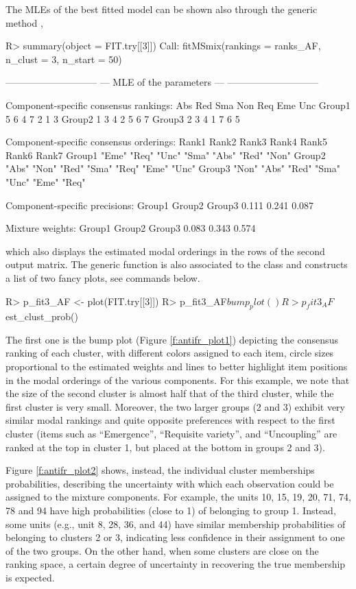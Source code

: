The MLEs of the best fitted model can be shown also through the generic method ,
\begin{example}
R> summary(object = FIT.try[[3]])
Call:
fitMSmix(rankings = ranks_AF, n_clust = 3, n_start = 50)

-----------------------------
--- MLE of the parameters ---
-----------------------------

Component-specific consensus rankings:
       Abs Red Sma Non Req Eme Unc
Group1   5   6   4   7   2   1   3
Group2   1   3   4   2   5   6   7
Group3   2   3   4   1   7   6   5

Component-specific consensus orderings:
       Rank1 Rank2 Rank3 Rank4 Rank5 Rank6 Rank7
Group1 "Eme" "Req" "Unc" "Sma" "Abs" "Red" "Non"
Group2 "Abs" "Non" "Red" "Sma" "Req" "Eme" "Unc"
Group3 "Non" "Abs" "Red" "Sma" "Unc" "Eme" "Req"

Component-specific precisions:
Group1 Group2 Group3
 0.111  0.241  0.087

Mixture weights:
Group1 Group2 Group3
 0.083  0.343  0.574
\end{example}
which also displays the estimated modal orderings in the rows of the second output matrix. The generic function  is also associated to the class  and constructs a list of two fancy plots, see commands below.
\begin{example}
R> p_fit3_AF <- plot(FIT.try[[3]])
R> p_fit3_AF$bump_plot()
R> p_fit3_AF$est_clust_prob()
\end{example}
The first one is the bump plot (Figure \ref{f:antifr_plot1}) depicting the consensus ranking of each cluster, with different colors assigned to each item, circle sizes proportional to the estimated weights and lines to better highlight item positions in the modal orderings of the various components. For this example, we note that the size of the second cluster is almost half that of the third cluster, while the first cluster is very small. Moreover, the two larger groups (2 and 3) exhibit very similar modal rankings and quite opposite preferences with respect to the first cluster (items such as ``Emergence'', ``Requisite variety'', and ``Uncoupling'' are ranked at the top in cluster 1, but placed at the bottom in groups 2 and 3).

Figure \ref{f:antifr_plot2} shows, instead, the individual cluster memberships probabilities, describing the uncertainty with which each observation could be assigned to the mixture components. For example, the units 10, 15, 19, 20, 71, 74, 78 and 94 have high probabilities (close to 1) of belonging to group 1. Instead, some units (e.g., unit 8, 28, 36, and 44) have similar membership probabilities of belonging to clusters 2 or 3, indicating less confidence in their assignment to one of the two groups. On the other hand, when some clusters are close on the ranking space, a certain degree of uncertainty in recovering the true membership is expected.

